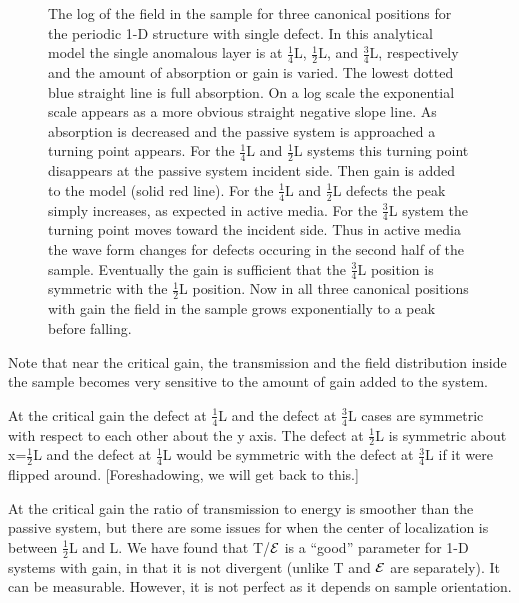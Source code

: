 \begin{figure}
\vskip -0.5cm
\caption[The log of the field in the sample for three canonical positions for the periodic 1-D structure with single defect.]{The log of the field in the sample for three canonical positions for the periodic 1-D structure with single defect. In this analytical model the single anomalous layer is at $ \frac{1}{4} $L, $ \frac{1}{2} $L, and $ \frac{3}{4} $L, respectively and the amount of absorption or gain is varied. The lowest dotted blue straight line is full absorption. On a log scale the exponential scale appears as a more obvious straight negative slope line. As absorption is decreased and the passive system is approached a turning point appears. For the $ \frac{1}{4} $L and $ \frac{1}{2} $L systems this turning point disappears at the passive system incident side. Then gain is added to the model (solid red line). For the $ \frac{1}{4} $L and $ \frac{1}{2} $L defects the peak simply increases, as expected in active media. For the $ \frac{3}{4} $L system the turning point moves toward the incident side. Thus in active media the wave form changes for defects occuring in the second half of the sample. Eventually the gain is sufficient that the $ \frac{3}{4} $L position is symmetric with the  $ \frac{1}{2} $L position. Now in all three canonical positions with gain the field in the sample grows exponentially to a peak before falling.}
\label{fig:periodicdefect}
\end{figure}

Note that near the critical gain, the transmission and the field distribution inside the sample becomes very sensitive to the amount of gain added to the system. %

At the critical gain the defect at $ \frac{1}{4} $L and the
defect at $ \frac{3}{4} $L
cases are symmetric with respect to each other about the y axis.
The defect at $ \frac{1}{2} $L is symmetric about x=$ \frac{1}{2} $L
and the defect at $ \frac{1}{4} $L would be symmetric
with the defect at $ \frac{3}{4} $L if
it were flipped around. [Foreshadowing, we will get back to this.]

At the critical gain the ratio of transmission to energy
is smoother than the passive system,
but there are some issues for when the center of
localization is between $ \frac{1}{2}$L and L. We have
found that T/${\cal E}$ is
a ``good'' parameter for 1-D systems with gain, in that it is
not divergent (unlike T and ${\cal E}$ are separately).  It can be
measurable.  However, it is not perfect as it depends on sample orientation.

